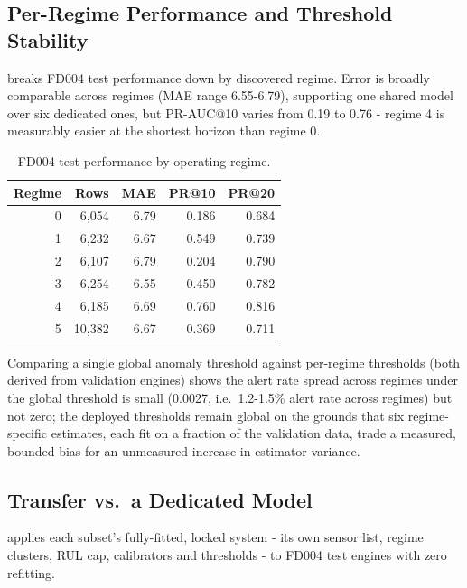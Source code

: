 \documentclass[9pt,a4paper,twocolumn,twoside]{rho-class/rho}
\begin{document}
    \subsection{Per-Regime Performance and Threshold Stability}

         breaks FD004 test performance down by discovered regime. Error is broadly comparable across regimes (MAE range 6.55-6.79), supporting one shared model over six dedicated ones, but PR-AUC@10 varies from 0.19 to 0.76 - regime 4 is measurably easier at the shortest horizon than regime 0.

        \begin{table}[H]
            \caption{FD004 test performance by operating regime.}
            \label{tab:regime}
            \begin{tabular}{rrrrr}
            \toprule
            \textbf{Regime} & \textbf{Rows} & \textbf{MAE} & \textbf{PR@10} & \textbf{PR@20} \\
            \midrule
            0 & 6{,}054  & 6.79 & 0.186 & 0.684 \\
            1 & 6{,}232  & 6.67 & 0.549 & 0.739 \\
            2 & 6{,}107  & 6.79 & 0.204 & 0.790 \\
            3 & 6{,}254  & 6.55 & 0.450 & 0.782 \\
            4 & 6{,}185  & 6.69 & 0.760 & 0.816 \\
            5 & 10{,}382 & 6.67 & 0.369 & 0.711 \\
            \bottomrule
            \end{tabular}
        \end{table}

        Comparing a single global anomaly threshold against per-regime thresholds (both derived from validation engines) shows the alert rate spread across regimes under the global threshold is small (0.0027, i.e.\ 1.2-1.5\% alert rate across regimes) but not zero; the deployed thresholds remain global on the grounds that six regime-specific estimates, each fit on a fraction of the validation data, trade a measured, bounded bias for an unmeasured increase in estimator variance.

    \subsection{Transfer vs.\ a Dedicated Model}

         applies each subset's fully-fitted, locked system - its own sensor list, regime clusters, RUL cap, calibrators and thresholds - to FD004 test engines with zero refitting.
\end{document}
